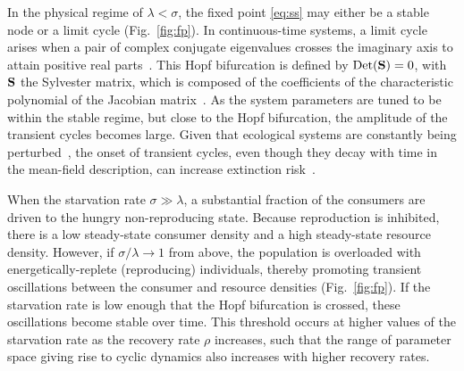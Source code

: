 \documentclass[twocolumn,preprintnumbers,amsmath,amssymb,superscriptaddress]{revtex4}
\begin{document}
In the physical regime of $\lambda<\sigma$, the fixed point \eqref{eq:ss} may either be a stable node or a limit cycle (Fig.~\ref{fig:fp}).
In continuous-time systems, a limit cycle arises when a pair of complex conjugate eigenvalues crosses the imaginary axis to attain positive real parts~\citep{GuckHolmes}.
This Hopf bifurcation is defined by ${\rm Det}({\bf S}) = 0$, with $\bf S$ the Sylvester matrix, which is composed of the coefficients of the characteristic polynomial of the Jacobian matrix~\citep{Gross:2004p2428}.
As the system parameters are tuned to be within the stable regime, but close to the Hopf bifurcation, the amplitude of the transient cycles becomes large.
Given that ecological systems are constantly being perturbed~\citep{Hastings:2001jh}, the onset of transient cycles, even though they decay with time in the mean-field description, can increase extinction risk~\citep{Neubert:1997wk,Caswell:2005eo,Neubert:2009td}.

When the starvation rate $\sigma\gg\lambda$, a substantial fraction of the consumers are driven to the hungry non-reproducing state.
Because reproduction is inhibited, there is a low steady-state consumer density and a high steady-state resource density.
However, if $\sigma/\lambda\to 1$ from above, the population is overloaded with energetically-replete (reproducing) individuals, thereby promoting transient oscillations between the consumer and resource densities (Fig.~\ref{fig:fp}).
If the starvation rate is low enough that the Hopf bifurcation is crossed, these oscillations become stable over time.
This threshold occurs at higher values of the starvation rate as the recovery rate $\rho$ increases, such that the range of parameter space giving rise to cyclic dynamics also increases with higher recovery rates.\\

\end{document}
